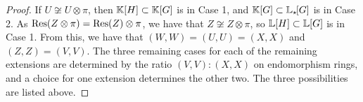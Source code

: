 \begin{proof}
    If $U \not\cong U \otimes \pi$, then ${\mathbb K}[H] \subset {\mathbb K}[G]$ is in Case 1, and ${\mathbb K}[G] \subset {\mathbb L}_{\star \hspace{-0.1em}}[G]$ is in Case 2. As $\Res(Z \otimes \pi) = \Res(Z) \otimes \pi$, we have that $Z \not\cong Z \otimes \pi$, so ${\mathbb L}[H] \subset {\mathbb L}[G]$ is in Case 1. From this, we have that $(W,W) = (U,U) = (X,X)$ and $(Z,Z) = (V,V)$. The three remaining cases for each of the remaining extensions are determined by the ratio $(V,V) : (X,X)$ on endomorphism rings, and a choice for one extension determines the other two. The three possibilities are listed above.
\end{proof}

